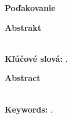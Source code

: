 \ifdefined\podakovanie
	\newpage
	\null
	\vfill
	{\noindent\large\bf Poďakovanie} 
	\vspace{1.5cm}
	
	\podakovanie
	\vspace{1cm}
\fi
\thispagestyle{empty}

\newpage
{\noindent\large\bf Abstrakt}
\vspace{1cm}

\noindent \abstraktPoSlovensky \\

{\noindent \textbf{Kľúčové slová:} \emph{\klucoveSlovaPoSlovensky}.} 
\thispagestyle{empty}

\newpage
{\noindent\large\bf Abstract}
\vspace{1cm}
 
\noindent \abstraktPoAnglicky \\

{\noindent \textbf{Keywords:} \emph{\klucoveSlovaPoAnglicky}.}
\thispagestyle{empty}


\newpage
{}
\tableofcontents
\thispagestyle{empty}
\newpage{}
